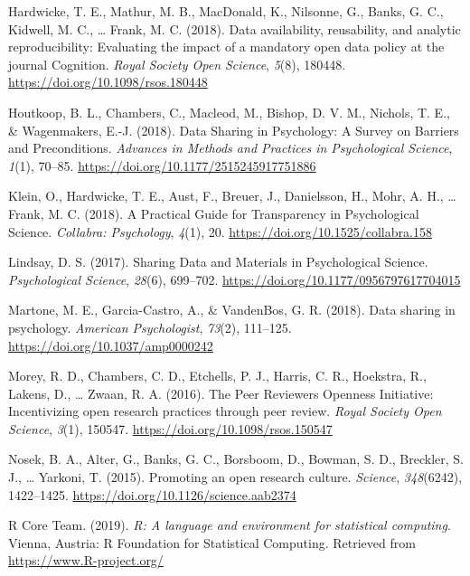 \documentclass[
  english,
  jou,floatsintext]{apa6}
\newlength{\cslhangindent}
\newenvironment{cslreferences}%
  {\setlength{\parindent}{0pt}%
  \everypar{\setlength{\hangindent}{\cslhangindent}}\ignorespaces}%
  {\par}
\begin{document}
\begin{cslreferences}
\leavevmode\hypertarget{ref-HardwickeDataavailabilityreusability2018}{}%
Hardwicke, T. E., Mathur, M. B., MacDonald, K., Nilsonne, G., Banks, G. C., Kidwell, M. C., \ldots{} Frank, M. C. (2018). Data availability, reusability, and analytic reproducibility: Evaluating the impact of a mandatory open data policy at the journal Cognition. \emph{Royal Society Open Science}, \emph{5}(8), 180448. \url{https://doi.org/10.1098/rsos.180448}

\leavevmode\hypertarget{ref-HoutkoopDataSharingPsychology2018}{}%
Houtkoop, B. L., Chambers, C., Macleod, M., Bishop, D. V. M., Nichols, T. E., \& Wagenmakers, E.-J. (2018). Data Sharing in Psychology: A Survey on Barriers and Preconditions. \emph{Advances in Methods and Practices in Psychological Science}, \emph{1}(1), 70--85. \url{https://doi.org/10.1177/2515245917751886}

\leavevmode\hypertarget{ref-KleinPracticalGuideTransparency2018}{}%
Klein, O., Hardwicke, T. E., Aust, F., Breuer, J., Danielsson, H., Mohr, A. H., \ldots{} Frank, M. C. (2018). A Practical Guide for Transparency in Psychological Science. \emph{Collabra: Psychology}, \emph{4}(1), 20. \url{https://doi.org/10.1525/collabra.158}

\leavevmode\hypertarget{ref-LindsaySharingDataMaterials2017}{}%
Lindsay, D. S. (2017). Sharing Data and Materials in Psychological Science. \emph{Psychological Science}, \emph{28}(6), 699--702. \url{https://doi.org/10.1177/0956797617704015}

\leavevmode\hypertarget{ref-MartoneDatasharingpsychology2018}{}%
Martone, M. E., Garcia-Castro, A., \& VandenBos, G. R. (2018). Data sharing in psychology. \emph{American Psychologist}, \emph{73}(2), 111--125. \url{https://doi.org/10.1037/amp0000242}

\leavevmode\hypertarget{ref-morey_peer_2016}{}%
Morey, R. D., Chambers, C. D., Etchells, P. J., Harris, C. R., Hoekstra, R., Lakens, D., \ldots{} Zwaan, R. A. (2016). The Peer Reviewers Openness Initiative: Incentivizing open research practices through peer review. \emph{Royal Society Open Science}, \emph{3}(1), 150547. \url{https://doi.org/10.1098/rsos.150547}

\leavevmode\hypertarget{ref-nosek_promoting_2015}{}%
Nosek, B. A., Alter, G., Banks, G. C., Borsboom, D., Bowman, S. D., Breckler, S. J., \ldots{} Yarkoni, T. (2015). Promoting an open research culture. \emph{Science}, \emph{348}(6242), 1422--1425. \url{https://doi.org/10.1126/science.aab2374}

\leavevmode\hypertarget{ref-R-base}{}%
R Core Team. (2019). \emph{R: A language and environment for statistical computing}. Vienna, Austria: R Foundation for Statistical Computing. Retrieved from \url{https://www.R-project.org/}


\end{cslreferences}
\end{document}
